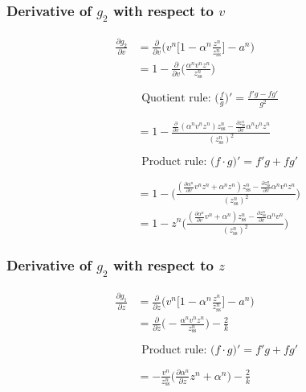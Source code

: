 \documentclass{article}
\begin{document}
\subsubsection*{Derivative of $g_2$ with respect to $v$}
\begin{equation}
    \begin{aligned}
        \frac{\partial g_2}{\partial v} &= \frac{\partial}{\partial v} \Bigg(v^n\bigg[1-\alpha^n\frac{z^n}{z_\text{ss}^n}\bigg]-a^n\Bigg)\\
        &= 1 - \frac{\partial}{\partial v}\Bigg(\frac{\alpha^nv^nz^n}{z_\text{ss}^n}\Bigg)\\
        &\\
        &\begin{gathered}
        \text{Quotient rule: }\boxed{\Bigg(\frac{f}{g}\Bigg)' = \frac{f'g - fg'}{g^2}}
        \end{gathered}
        \\
        &\\
        &= 1 - \frac{\frac{\partial}{\partial v}(\alpha^n v^n z^n)z_\text{ss}^n - \frac{\partial z_\text{ss}^n}{\partial v}\alpha^n v^n z^n}{(z_\text{ss}^n)^2}
        \\
        &\\
        &\begin{gathered}
        \text{Product rule: }\boxed{\big(f\cdot g\big)' = f'g + fg'}
        \end{gathered}
        \\
        &\\
        &= 1-\Bigg(\frac{(\frac{\partial \alpha^n}{\partial v}v^nz^n + \alpha^nz^n)z_\text{ss}^n - \frac{\partial z_\text{ss}^n}{\partial v}\alpha^n v^nz^n}{(z_\text{ss}^n)^2}\Bigg)\\
        &= 1-z^n\Bigg(\frac{(\frac{\partial \alpha^n}{\partial v}v^n + \alpha^n)z_\text{ss}^n - \frac{\partial z_\text{ss}^n}{\partial v}\alpha^n v^n}{(z_\text{ss}^n)^2}\Bigg)
    \end{aligned}
\end{equation}
\subsubsection{Derivative of $g_2$ with respect to $z$}
\begin{equation}
    \begin{aligned}
        \frac{\partial g_1}{\partial z} &= \frac{\partial}{\partial z} \Bigg(v^n\bigg[1-\alpha^n\frac{z^n}{z_\text{ss}^n}\bigg] - a^n\Bigg)\\
        &= \frac{\partial}{\partial z}\Bigg(-\frac{\alpha^nv^nz^n}{z_\text{ss}^n}\Bigg)-\frac{2}{k}
        \\
        &\\
        &\begin{gathered}
        \text{Product rule: }\boxed{\big(f\cdot g\big)' = f'g + fg'}
        \end{gathered}
        \\
        &\\
        & = -\frac{v^n}{z_\text{ss}^n}\bigg(\frac{\partial \alpha^n}{\partial z}z^n + \alpha^n\bigg)-\frac{2}{k}
    \end{aligned}
\end{equation}
\end{document}
